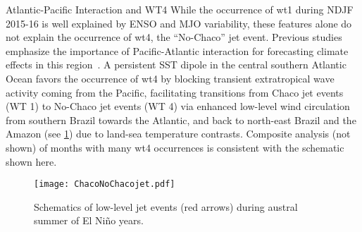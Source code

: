 \begin{block}{Atlantic-Pacific Interaction and WT4}
    While the occurrence of \gls{wt}1 during NDJF 2015-16 is well explained by ENSO and MJO variability, these features alone do not explain the occurrence of \gls{wt}4, the ``No-Chaco'' jet event.
    Previous studies emphasize the importance of Pacific-Atlantic interaction for forecasting climate effects in this region~\cite{Barreiro:2017ct}.
    A persistent SST dipole in the central southern Atlantic Ocean favors the occurrence of \gls{wt}4 by blocking transient extratropical wave activity coming from the Pacific, facilitating transitions from Chaco jet events (WT 1) to No-Chaco jet events (WT 4) via enhanced low-level wind circulation from southern Brazil towards the Atlantic, and back to north-east Brazil and the Amazon (see \cref{fig:atlantic-pacific}) due to land-sea temperature contrasts.
    Composite analysis (not shown) of months with many \gls{wt}4 occurrences is consistent with the schematic shown here.
    \begin{framed}
        \begin{figure}
            \centering
            \texttt{[image: ChacoNoChacojet.pdf]}
            \caption{
                Schematics of low-level jet events (red arrows) during austral summer of El Ni\~{n}o years.
            }\label{fig:atlantic-pacific}
        \end{figure}
    \end{framed}
\end{block}
